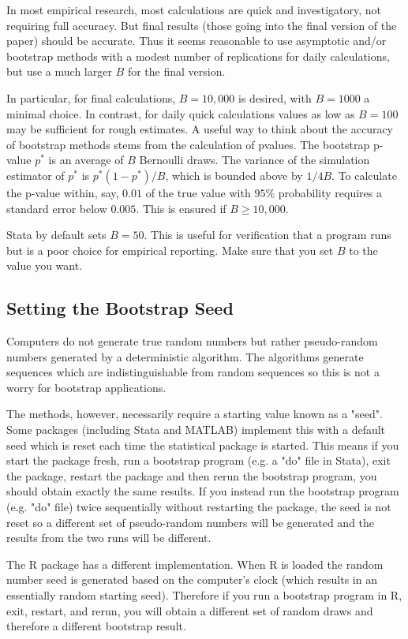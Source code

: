 \documentclass[10pt]{article}
\begin{document}
In most empirical research, most calculations are quick and investigatory, not requiring full accuracy. But final results (those going into the final version of the paper) should be accurate. Thus it seems reasonable to use asymptotic and/or bootstrap methods with a modest number of replications for daily calculations, but use a much larger $B$ for the final version.

In particular, for final calculations, $B=10,000$ is desired, with $B=1000$ a minimal choice. In contrast, for daily quick calculations values as low as $B=100$ may be sufficient for rough estimates. A useful way to think about the accuracy of bootstrap methods stems from the calculation of pvalues. The bootstrap p-value $p^{*}$ is an average of $B$ Bernoulli draws. The variance of the simulation estimator of $p^{*}$ is $p^{*}\left(1-p^{*}\right) / B$, which is bounded above by $1 / 4 B$. To calculate the $\mathrm{p}$-value within, say, $0.01$ of the true value with $95 \%$ probability requires a standard error below $0.005$. This is ensured if $B \geq 10,000$.

Stata by default sets $B=50$. This is useful for verification that a program runs but is a poor choice for empirical reporting. Make sure that you set $B$ to the value you want.

\subsection{Setting the Bootstrap Seed}
Computers do not generate true random numbers but rather pseudo-random numbers generated by a deterministic algorithm. The algorithms generate sequences which are indistinguishable from random sequences so this is not a worry for bootstrap applications.

The methods, however, necessarily require a starting value known as a "seed". Some packages (including Stata and MATLAB) implement this with a default seed which is reset each time the statistical package is started. This means if you start the package fresh, run a bootstrap program (e.g. a "do" file in Stata), exit the package, restart the package and then rerun the bootstrap program, you should obtain exactly the same results. If you instead run the bootstrap program (e.g. "do" file) twice sequentially without restarting the package, the seed is not reset so a different set of pseudo-random numbers will be generated and the results from the two runs will be different.

The R package has a different implementation. When $\mathrm{R}$ is loaded the random number seed is generated based on the computer's clock (which results in an essentially random starting seed). Therefore if you run a bootstrap program in R, exit, restart, and rerun, you will obtain a different set of random draws and therefore a different bootstrap result.
\end{document}
